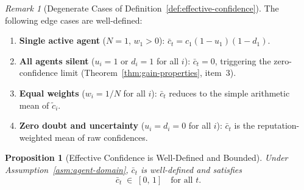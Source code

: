 \documentclass[12pt,openany]{book}
\numberwithin{equation}{chapter}
\theoremstyle{plain}
\newtheorem{proposition}[theorem]{Proposition}
\theoremstyle{definition}
\theoremstyle{remark}
\newtheorem{remark}[theorem]{Remark}
\begin{document}
\begin{remark}[Degenerate Cases of Definition~\ref{def:effective-confidence}]
\label{rem:effective-conf-degenerate}
The following edge cases are well-defined:
\begin{enumerate}
  \item \textbf{Single active agent} ($N = 1$, $w_1 > 0$):
        $\bar{c}_t = c_1(1-u_1)(1-d_1)$.
  \item \textbf{All agents silent} ($u_i = 1$ or $d_i = 1$
        for all $i$): $\bar{c}_t = 0$, triggering the
        zero-confidence limit (Theorem~\ref{thm:gain-properties},
        item~3).
  \item \textbf{Equal weights} ($w_i = 1/N$ for all $i$):
        $\bar{c}_t$ reduces to the simple arithmetic mean of
        $\tilde{c}_i$.
  \item \textbf{Zero doubt and uncertainty}
        ($u_i = d_i = 0$ for all $i$): $\bar{c}_t$ is the
        reputation-weighted mean of raw confidences.
\end{enumerate}
\end{remark}

\begin{proposition}[Effective Confidence is Well-Defined and Bounded]
\label{prop:confidence-bounded}
Under Assumption~\ref{asm:agent-domain},
$\bar{c}_t$ is well-defined and satisfies
\begin{equation}
  \bar{c}_t \;\in\; [0,\,1]
  \quad \text{for all } t.
  \label{eq:conf-bounded}
\end{equation}
\end{proposition}
\end{document}
